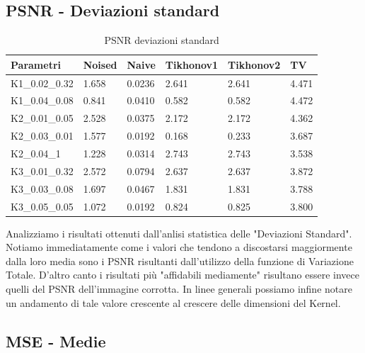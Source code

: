 \documentclass[12pt]{article}
\begin{document}
    \newpage
    \subsection{PSNR - Deviazioni standard}
    \begin{table}[!ht]
    \centering
    \begin{tabular}{|l|l|l|l|l|l|}
    \hline
        Parametri & Noised & Naive & Tikhonov1 & Tikhonov2 & TV \\ \hline
        K1\_0.02\_0.32 & 1.658 & 0.0236 & 2.641 & 2.641 & 4.471 \\ \hline
        K1\_0.04\_0.08 & 0.841 & 0.0410 & 0.582 & 0.582 & 4.472 \\ \hline
        K2\_0.01\_0.05 & 2.528 & 0.0375 & 2.172 & 2.172 & 4.362 \\ \hline
        K2\_0.03\_0.01 & 1.577 & 0.0192 & 0.168 & 0.233 & 3.687 \\ \hline
        K2\_0.04\_1    & 1.228 & 0.0314 & 2.743 & 2.743 & 3.538 \\ \hline
        K3\_0.01\_0.32 & 2.572 & 0.0794 & 2.637 & 2.637 & 3.872 \\ \hline
        K3\_0.03\_0.08 & 1.697 & 0.0467 & 1.831 & 1.831 & 3.788 \\ \hline
        K3\_0.05\_0.05 & 1.072 & 0.0192 & 0.824 & 0.825 & 3.800 \\ \hline
    \end{tabular}
    \caption{PSNR deviazioni standard}
    \label{table:8}
    \end{table}


    Analizziamo i risultati ottenuti dall'anlisi statistica delle "Deviazioni Standard".
    Notiamo immediatamente come i valori che tendono a discostarsi maggiormente dalla loro media sono i PSNR risultanti dall'utilizzo della funzione di Variazione Totale.
    D'altro canto i risultati più "affidabili mediamente" risultano essere invece quelli del PSNR dell'immagine corrotta.
    In linee generali possiamo infine notare un andamento di tale valore crescente al crescere delle dimensioni del Kernel.

    \newpage
    \subsection{MSE - Medie}
\end{document}
